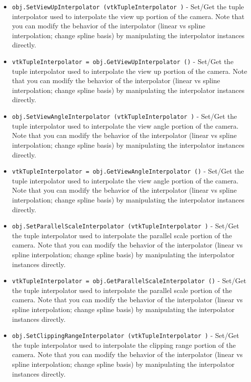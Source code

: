 \begin{itemize}
\item  \verb|obj.SetViewUpInterpolator (vtkTupleInterpolator )| -  Set/Get the tuple interpolator used to interpolate the view up portion
 of the camera. Note that you can modify the behavior of the interpolator
 (linear vs spline interpolation; change spline basis) by manipulating
 the interpolator instances directly.

\item  \verb|vtkTupleInterpolator = obj.GetViewUpInterpolator ()| -  Set/Get the tuple interpolator used to interpolate the view up portion
 of the camera. Note that you can modify the behavior of the interpolator
 (linear vs spline interpolation; change spline basis) by manipulating
 the interpolator instances directly.

\item  \verb|obj.SetViewAngleInterpolator (vtkTupleInterpolator )| -  Set/Get the tuple interpolator used to interpolate the view angle portion
 of the camera. Note that you can modify the behavior of the interpolator
 (linear vs spline interpolation; change spline basis) by manipulating
 the interpolator instances directly.

\item  \verb|vtkTupleInterpolator = obj.GetViewAngleInterpolator ()| -  Set/Get the tuple interpolator used to interpolate the view angle portion
 of the camera. Note that you can modify the behavior of the interpolator
 (linear vs spline interpolation; change spline basis) by manipulating
 the interpolator instances directly.

\item  \verb|obj.SetParallelScaleInterpolator (vtkTupleInterpolator )| -  Set/Get the tuple interpolator used to interpolate the parallel scale portion
 of the camera. Note that you can modify the behavior of the interpolator
 (linear vs spline interpolation; change spline basis) by manipulating
 the interpolator instances directly.

\item  \verb|vtkTupleInterpolator = obj.GetParallelScaleInterpolator ()| -  Set/Get the tuple interpolator used to interpolate the parallel scale portion
 of the camera. Note that you can modify the behavior of the interpolator
 (linear vs spline interpolation; change spline basis) by manipulating
 the interpolator instances directly.

\item  \verb|obj.SetClippingRangeInterpolator (vtkTupleInterpolator )| -  Set/Get the tuple interpolator used to interpolate the clipping range portion
 of the camera. Note that you can modify the behavior of the interpolator
 (linear vs spline interpolation; change spline basis) by manipulating
 the interpolator instances directly.


\end{itemize}
